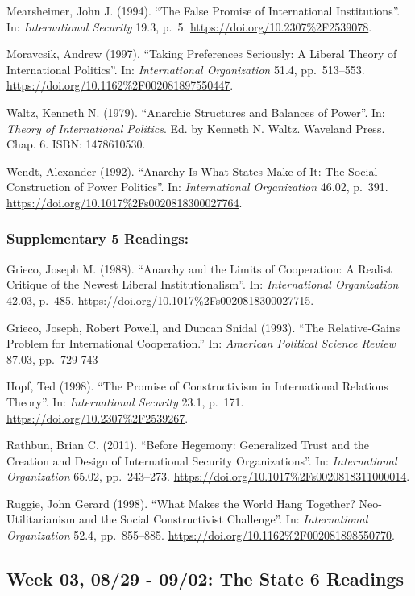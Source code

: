\documentclass[10pt,]{article}
\begin{document}
Mearsheimer, John J. (1994). ``The False Promise of International
Institutions''. In: \emph{International Security} 19.3, p.~5.
\url{https://doi.org/10.2307\%2F2539078}.

Moravcsik, Andrew (1997). ``Taking Preferences Seriously: A Liberal
Theory of International Politics''. In:
\emph{International Organization} 51.4, pp.~513--553.
\url{https://doi.org/10.1162\%2F002081897550447}.

Waltz, Kenneth N. (1979). ``Anarchic Structures and Balances of Power''.
In: \emph{Theory of International Politics}. Ed. by Kenneth N. Waltz.
Waveland Press. Chap. 6. ISBN: 1478610530.

Wendt, Alexander (1992). ``Anarchy Is What States Make of It: The Social
Construction of Power Politics''. In: \emph{International Organization}
46.02, p.~391. \url{https://doi.org/10.1017\%2Fs0020818300027764}.

\subsubsection{Supplementary \textbar{} 5
Readings:}\label{supplementary-5-readings-1}

Grieco, Joseph M. (1988). ``Anarchy and the Limits of Cooperation: A
Realist Critique of the Newest Liberal Institutionalism''. In:
\emph{International Organization} 42.03, p.~485.
\url{https://doi.org/10.1017\%2Fs0020818300027715}.

Grieco, Joseph, Robert Powell, and Duncan Snidal (1993). ``The
Relative-Gains Problem for International Cooperation.'' In:
\emph{American Political Science Review} 87.03, pp.~729-743

Hopf, Ted (1998). ``The Promise of Constructivism in International
Relations Theory''. In: \emph{International Security} 23.1, p.~171.
\url{https://doi.org/10.2307\%2F2539267}.

Rathbun, Brian C. (2011). ``Before Hegemony: Generalized Trust and the
Creation and Design of International Security Organizations''. In:
\emph{International Organization} 65.02, pp.~243--273.
\url{https://doi.org/10.1017\%2Fs0020818311000014}.

Ruggie, John Gerard (1998). ``What Makes the World Hang Together?
Neo-Utilitarianism and the Social Constructivist Challenge''. In:
\emph{International Organization} 52.4, pp.~855--885.
\url{https://doi.org/10.1162\%2F002081898550770}.

\subsection{Week 03, 08/29 - 09/02: The State \textbar{} 6
Readings}\label{week-03-0829---0902-the-state-6-readings}
\end{document}
